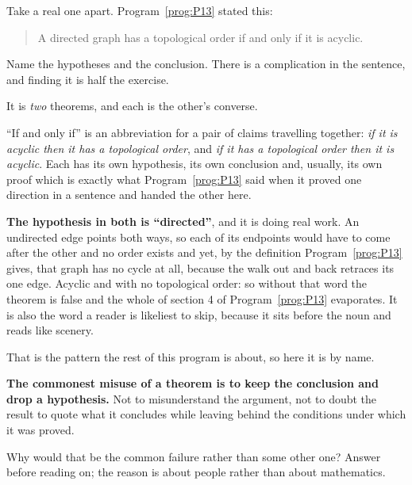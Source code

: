 \begin{fr}
Take a real one apart. Program~\ref{prog:P13} stated this:

\begin{quote}
A directed graph has a topological order if and only if it is acyclic.
\end{quote}

Name the hypotheses and the conclusion. There is a complication in the
sentence, and finding it is half the exercise.
\dotline
\nextframe
\end{fr}

\begin{fr}
\begin{ansblock}
It is \emph{two} theorems, and each is the other's converse.
\end{ansblock}

\enquote{If and only if} is an abbreviation for a pair of claims travelling
together: \emph{if it is acyclic then it has a topological order}, and
\emph{if it has a topological order then it is acyclic}. Each has its own
hypothesis, its own conclusion and, usually, its own proof \dash{} which is
exactly what Program~\ref{prog:P13} said when it proved one direction in a
sentence and handed the other here.

\textbf{The hypothesis in both is \enquote{directed}}, and it is doing real
work. An undirected edge points both ways, so each of its endpoints would have
to come after the other and no order exists \dash{} and yet, by the definition
Program~\ref{prog:P13} gives, that graph has no cycle at all, because the walk
out and back retraces its one edge. Acyclic and with no topological order: so
without that word the theorem is false and the whole of section 4 of
Program~\ref{prog:P13} evaporates. It is also the word a reader is likeliest
to skip, because it sits before the noun and reads like scenery.
\end{fr}

\begin{fr}
That is the pattern the rest of this program is about, so here it is by name.

\textbf{The commonest misuse of a theorem is to keep the conclusion and drop a
hypothesis.} Not to misunderstand the argument, not to doubt the result
\dash{} to quote what it concludes while leaving behind the conditions under
which it was proved.

Why would that be the common failure rather than some other one? Answer before
reading on; the reason is about people rather than about mathematics.
\nextframe
\end{fr}

